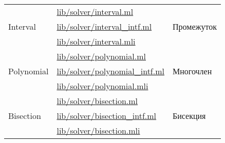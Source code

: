 \begin{centering}
\begin{longtable}{|l|l|l|}
        \multirow{3}{*}{Interval}                             & \href{https://github.com/prekel/chapgame/blob/master/lib/solver/interval.ml}{lib/solver/interval.ml}                                     & \multirow{3}{*}{Промежуток}                   \\\nopagebreak \cline{2-2}
                                                              & \href{https://github.com/prekel/chapgame/blob/master/lib/solver/interval\_intf.ml}{lib/solver/interval\_intf.ml}                         &                                               \\\nopagebreak \cline{2-2}
                                                              & \href{https://github.com/prekel/chapgame/blob/master/lib/solver/interval.mli}{lib/solver/interval.mli}                                   &                                               \\ \hline
        \multirow{3}{*}{Polynomial}                           & \href{https://github.com/prekel/chapgame/blob/master/lib/solver/polynomial.ml}{lib/solver/polynomial.ml}                                 & \multirow{3}{*}{Многочлен}                    \\\nopagebreak \cline{2-2}
                                                              & \href{https://github.com/prekel/chapgame/blob/master/lib/solver/polynomial\_intf.ml}{lib/solver/polynomial\_intf.ml}                     &                                               \\\nopagebreak \cline{2-2}
                                                              & \href{https://github.com/prekel/chapgame/blob/master/lib/solver/polynomial.mli}{lib/solver/polynomial.mli}                               &                                               \\ \hline
        \multirow{3}{*}{Bisection}                            & \href{https://github.com/prekel/chapgame/blob/master/lib/solver/bisection.ml}{lib/solver/bisection.ml}                                   & \multirow{3}{*}{Бисекция}                     \\\nopagebreak \cline{2-2}
                                                              & \href{https://github.com/prekel/chapgame/blob/master/lib/solver/bisection\_intf.ml}{lib/solver/bisection\_intf.ml}                       &                                               \\\nopagebreak \cline{2-2}
                                                              & \href{https://github.com/prekel/chapgame/blob/master/lib/solver/bisection.mli}{lib/solver/bisection.mli}                                 &                                               \\ \hline

\end{longtable}
\end{centering}
